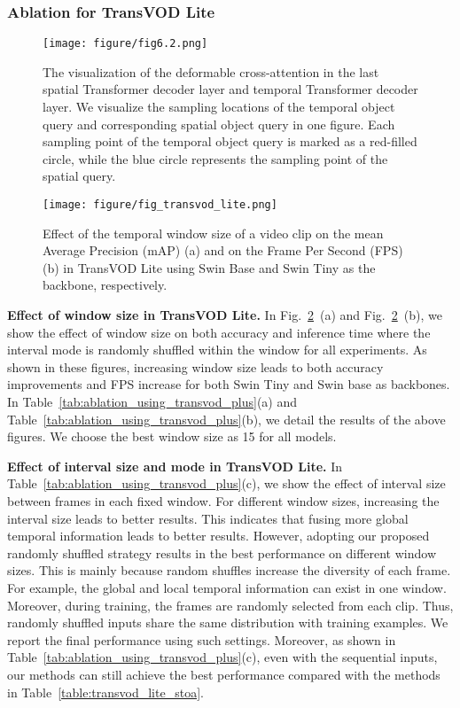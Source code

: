 \documentclass[10pt,journal,compsoc]{IEEEtran}
\begin{document}
\subsubsection{Ablation for TransVOD Lite}
\label{sec:ablation_transvod_lite}

\begin{figure}[t!]
    \texttt{[image: figure/fig6.2.png]} 
    \caption{\small The visualization of the deformable cross-attention in the last spatial Transformer decoder layer and temporal Transformer decoder layer. We visualize the sampling locations of the temporal object query and corresponding spatial object query in one figure. Each sampling point of the temporal object query is marked as a red-filled circle, while the blue circle represents the sampling point of the spatial query.}
    \label{fig:sample_vis_res}
\end{figure}

\begin{figure}[t!]
    \centering
    \texttt{[image: figure/fig\_transvod\_lite.png]} 
    \caption{\small Effect of the temporal window size  of a video clip on the mean Average Precision (mAP) (a) and on the Frame Per Second (FPS) (b) in TransVOD Lite using Swin Base and Swin Tiny as the backbone, respectively. }
    \label{fig:transvod_lite}
    \vspace{-5mm}
\end{figure}

\noindent
\textbf{Effect of window size in TransVOD Lite.} In Fig.~\ref{fig:transvod_lite}~(a) and Fig.~\ref{fig:transvod_lite}~(b), we show the effect of window size on both accuracy and inference time where the interval mode is randomly shuffled within the window for all experiments. As shown in these figures, increasing window size leads to both accuracy improvements and FPS increase for both Swin Tiny and Swin base as backbones. In Table~\ref{tab:ablation_using_transvod_plus}(a) and Table~\ref{tab:ablation_using_transvod_plus}(b), we detail the results of the above figures. We choose the best window size  as 15 for all models.




\noindent
\textbf{Effect of interval size and mode in TransVOD Lite.} 
In Table~\ref{tab:ablation_using_transvod_plus}(c), we show the effect of interval size between frames in each fixed window. For different window sizes, increasing the interval size leads to better results. This indicates that fusing more global temporal information leads to better results. However, adopting our proposed randomly shuffled strategy results in the best performance on different window sizes. This is mainly because random shuffles increase the diversity of each frame. For example, the global and local temporal information can exist in one window. Moreover, during training, the frames are randomly selected from each clip. Thus, randomly shuffled inputs share the same distribution with training examples. We report the final performance using such settings. Moreover, as shown in Table~\ref{tab:ablation_using_transvod_plus}(c), even with the sequential inputs, our methods can still achieve the best performance compared with the methods in Table~\ref{table:transvod_lite_stoa}.
\end{document}
